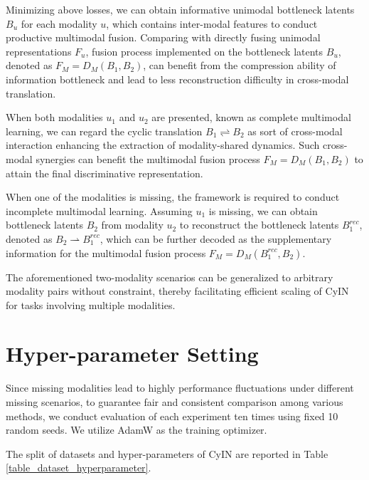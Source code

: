 \documentclass{article}
\begin{document}
Minimizing above losses, we can obtain informative unimodal bottleneck latents $B_u$ for each modality $u$, which contains inter-modal features to conduct productive multimodal fusion. Comparing with directly fusing unimodal representations $F_u$, fusion process implemented on the bottleneck latents $B_u$, denoted as $F_M=D_M(B_1,B_2)$, can benefit from the compression ability of information bottleneck and lead to less reconstruction difficulty in cross-modal translation.

When both modalities $u_1$ and $u_2$ are presented, known as complete multimodal learning, we can regard the cyclic translation $B_1 \rightleftharpoons B_2$ as sort of cross-modal interaction enhancing the extraction of modality-shared dynamics. Such cross-modal synergies can benefit the multimodal fusion process $F_M=D_M(B_1,B_2)$ to attain the final discriminative representation. 

When one of the modalities is missing, the framework is required to conduct incomplete multimodal learning. Assuming $u_1$ is missing, we can obtain bottleneck latents $B_2$ from modality $u_2$ to reconstruct the bottleneck latents $B^{rec}_1$, denoted as $B_2 \rightharpoonup B^{rec}_1$, which can be further decoded as the supplementary information for the multimodal fusion process $F_M=D_M(B^{rec}_1,B_2)$. 

The aforementioned two-modality scenarios can be generalized to arbitrary modality pairs without constraint, thereby facilitating efficient scaling of CyIN for tasks involving multiple modalities.

\section{Hyper-parameter Setting} 
\label{appendix_hyperparam}

Since missing modalities lead to highly performance fluctuations under different missing scenarios, to guarantee fair and consistent comparison among various methods, we conduct evaluation of each experiment ten times using fixed 10 random seeds. We utilize AdamW \cite{loshchilov2018decoupled} as the training optimizer. %
 

The split of datasets and hyper-parameters of CyIN are reported in Table \ref{table_dataset_hyperparameter}.
\end{document}

